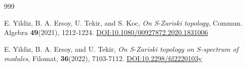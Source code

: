 \documentclass[11pt]{article}
\begin{document}
\begin{thebibliography}{999}
		
		E. Yildiz, B. A. Ersoy, U. Tekir, and S. Koc, \textit{ On S-Zariski topology}, Commun. Algebra \textbf{49}(2021), 1212-1224. \href{https://www.tandfonline.com/doi/full/10.1080/00927872.2020.1831006}{DOI:10.1080/00927872.2020.1831006}

		E. Yildiz, B. A. Ersoy, and  U. Tekir, \textit{On S-Zariski topology on $S$-spectrum of modules}, Filomat, \textbf{36}(2022), 7103-7112. \href{https://doiserbia.nb.rs/Article.aspx?ID=0354-51802220103Y}{DOI:10.2298/fil2220103y}
		
	\end{thebibliography}
\end{document}
